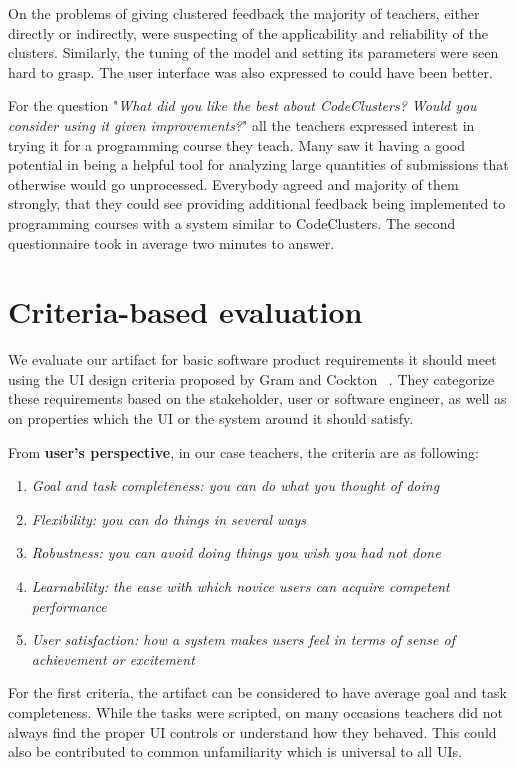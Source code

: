 On the problems of giving clustered feedback the majority of teachers, either directly or indirectly, were suspecting of the applicability and reliability of the clusters. Similarly, the tuning of the model and setting its parameters were seen hard to grasp. The user interface was also expressed to could have been better.

For the question "\textit{What did you like the best about CodeClusters? Would you consider using it given improvements?}" all the teachers expressed interest in trying it for a programming course they teach. Many saw it having a good potential in being a helpful tool for analyzing large quantities of submissions that otherwise would go unprocessed. Everybody agreed and majority of them strongly, that they could see providing additional feedback being implemented to programming courses with a system similar to CodeClusters. The second questionnaire took in average two minutes to answer.

\section{Criteria-based evaluation}

We evaluate our artifact for basic software product requirements it should meet using the UI design criteria proposed by Gram and Cockton ~\cite{drs-drm, drs-gram-cockton-1996}. They categorize these requirements based on the stakeholder, user or software engineer, as well as on properties which the UI or the system around it should satisfy.

\bigskip
\noindent
From \textbf{user's perspective}, in our case teachers, the criteria are as following:

\begin{enumerate}
    \item \textit{Goal and task completeness: you can do what you thought of doing}
    \item \textit{Flexibility: you can do things in several ways}
    \item \textit{Robustness: you can avoid doing things you wish you had not done}
    \item \textit{Learnability: the ease with which novice users can acquire competent performance}
    \item \textit{User satisfaction: how a system makes users feel in terms of sense of achievement or excitement}
\end{enumerate}

For the first criteria, the artifact can be considered to have average goal and task completeness. While the tasks were scripted, on many occasions teachers did not always find the proper UI controls or understand how they behaved. This could also be contributed to common unfamiliarity which is universal to all UIs.

